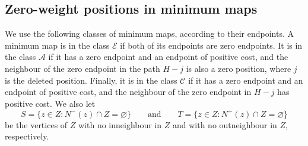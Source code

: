 \subsection{Zero-weight positions in minimum maps}
We use the following classes of minimum maps, according to their endpoints. A minimum map is in the class $\mathcal E$ if both of its endpoints are zero endpoints. It is in the class $\mathcal A$ if it has a zero endpoint and an endpoint of positive cost, and the neighbour of the zero endpoint in the path $H-j$ is also a zero position, where $j$ is the deleted position. Finally, it is in the class $\mathcal C$ if it has a zero endpoint and an endpoint of positive cost, and the neighbour of the zero endpoint in $H-j$ has positive cost.
We also let
\[
 S=\{z\in Z:N^-(z)\cap Z=\varnothing\}\qquad\text{and}\qquad
 T=\{z\in Z:N^+(z)\cap Z=\varnothing\}
\]
be the vertices of $Z$ with no inneighbour in $Z$ and with no outneighbour in $Z$, respectively.

